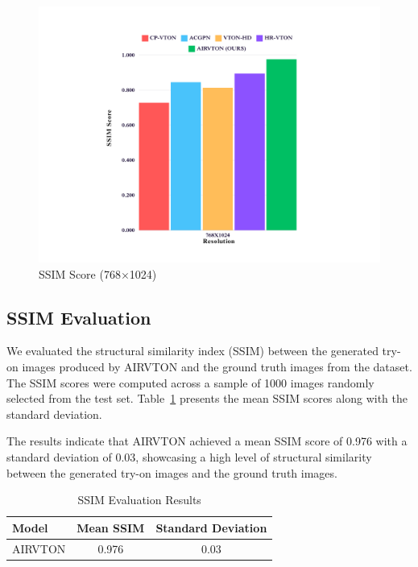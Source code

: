 \begin{figure}
    \includegraphics[width=\textwidth]{components/images/7.png}
    \caption{SSIM Score (768$\times$1024)}
    \label{fig:ssim-score-high}
\end{figure}

\subsection{SSIM Evaluation}

We evaluated the structural similarity index (SSIM) between the generated try-on images produced by AIRVTON and the ground truth images from the dataset. The SSIM scores were computed across a sample of 1000 images randomly selected from the test set. Table~\ref{tab:ssim_results} presents the mean SSIM scores along with the standard deviation.

The results indicate that AIRVTON achieved a mean SSIM score of 0.976 with a standard deviation of 0.03, showcasing a high level of structural similarity between the generated try-on images and the ground truth images.

\begin{table}[htbp]
  \caption{SSIM Evaluation Results}
  \label{tab:ssim_results}
  \centering
  \begin{tabular}{lcc}
    \toprule
    \textbf{Model} & \textbf{Mean SSIM} & \textbf{Standard Deviation} \\
    \midrule
    AIRVTON & 0.976 & 0.03 \\
    \bottomrule
  \end{tabular}
\end{table}

